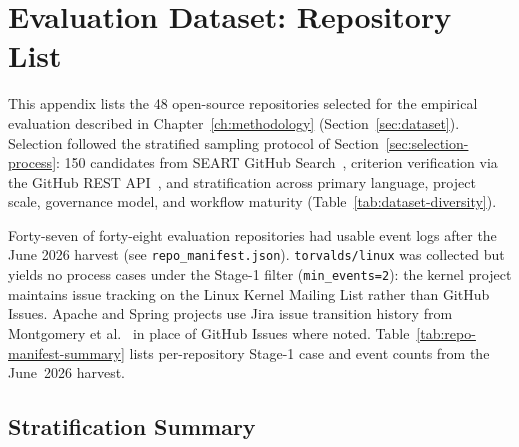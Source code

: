 %

\chapter{Evaluation Dataset: Repository List}
\label{app:repository-list}

This appendix lists the 48 open-source repositories selected for the
empirical evaluation described in Chapter~\ref{ch:methodology}
(Section~\ref{sec:dataset}). Selection followed the stratified sampling
protocol of Section~\ref{sec:selection-process}: 150 candidates from
SEART GitHub Search~\cite{seart2021}, criterion verification via the
GitHub REST API~\cite{github2023api}, and stratification across primary
language, project scale, governance model, and workflow maturity
(Table~\ref{tab:dataset-diversity}).

Forty-seven of forty-eight evaluation repositories had usable event logs after
the June 2026 harvest (see \texttt{repo\_manifest.json}).
\texttt{torvalds/linux} was collected but yields no process cases under the
Stage-1 filter (\texttt{min\_events=2}): the kernel project maintains issue
tracking on the Linux Kernel Mailing List rather than GitHub Issues.
Apache and Spring projects use Jira issue
transition history from Montgomery et al.~\cite{montgomery2022jira} in
place of GitHub Issues where noted. Table~\ref{tab:repo-manifest-summary}
lists per-repository Stage-1 case and event counts from the June~2026 harvest.



\section{Stratification Summary}
\label{app:repo-strata}


